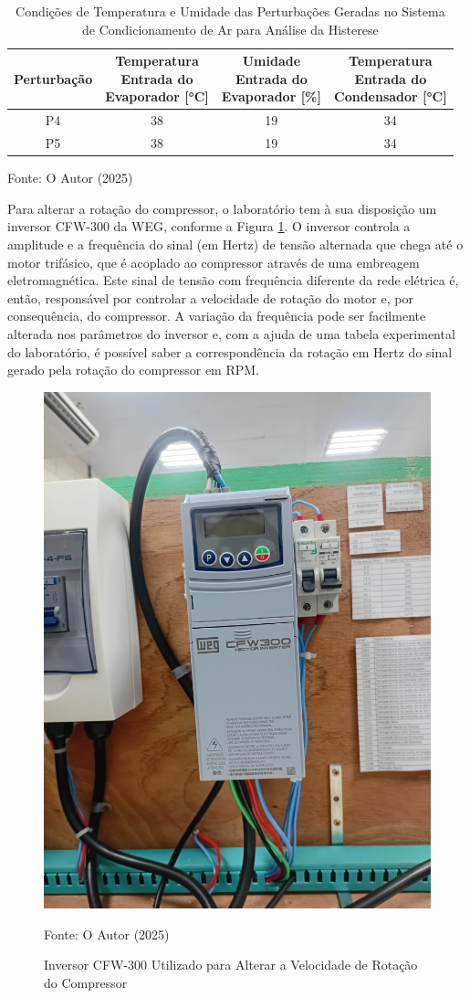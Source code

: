 \begin{table}[htb]
    \centering
\begin{tabular}{|c|c|c|c|}
    \hline
    \textbf{Perturbação} & 
    \makecell{\textbf{Temperatura} \\ \textbf{Entrada do} \\ \textbf{Evaporador [°C]}} &
    \makecell{\textbf{Umidade} \\ \textbf{Entrada do} \\ \textbf{Evaporador [\%]}} &
    \makecell{\textbf{Temperatura} \\ \textbf{Entrada do} \\ \textbf{Condensador [°C]}} \\
        \hline
        P4 & 38 & 19  & 34\\
        P5 & 38 & 19  & 34 \\
        \hline
    \end{tabular}
    \caption{Condições de Temperatura e Umidade das Perturbações Geradas no Sistema de Condicionamento de Ar para Análise da Histerese}
    \vspace{5pt} 
{\footnotesize Fonte: O Autor (2025) }
    \label{tab:pertubaçõesHistereseCondiçõesIniciais}
\end{table}

Para alterar a rotação do compressor, o laboratório \textcite{reve2023} tem à sua disposição um inversor CFW-300 da WEG, conforme a Figura \ref{fig:inversor CFW-300}. O inversor controla a amplitude e a frequência do sinal (em Hertz) de tensão alternada que chega até o motor trifásico, que é acoplado ao compressor através de uma embreagem eletromagnética. Este sinal de tensão com frequência diferente da rede elétrica é, então, responsável por controlar a velocidade de rotação do motor e, por consequência, do compressor. A variação da frequência pode ser facilmente alterada nos parâmetros do inversor e, com a ajuda de uma tabela experimental do laboratório, é possível saber a correspondência da rotação em Hertz do sinal gerado pela rotação do compressor em RPM.

\begin{figure}[h]
    \centering
    \includegraphics[width=0.45\linewidth]{FigurasdoTexto/inversorcfw-300.jpeg}
    \caption{Inversor CFW-300 Utilizado para Alterar a Velocidade de Rotação do Compressor}
    \label{fig:inversor CFW-300}
    {\footnotesize Fonte: O Autor (2025)}
\end{figure}

